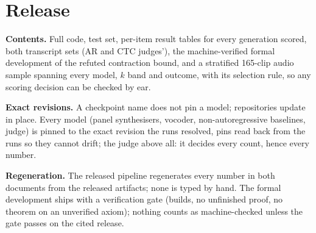\section{Release}
\label{sec:release}

\textbf{Contents.} Full code, test set, per-item result tables for every
generation scored, both transcript sets (AR and CTC judges'), the
machine-verified formal development of the refuted contraction bound, and
a stratified 165-clip audio sample spanning every model, $k$ band and
outcome, with its selection rule, so any scoring decision can be checked
by ear.

\textbf{Exact revisions.} A checkpoint name does not pin a model;
repositories update in place. Every model (panel synthesisers, vocoder,
non-autoregressive baselines, judge) is pinned to the exact revision the
runs resolved, pins read back from the runs so they cannot drift; the
judge above all: it decides every count, hence every number.

\textbf{Regeneration.} The released pipeline regenerates every number in
both documents from the released artifacts; none is typed by hand. The
formal development ships with a verification gate (builds, no unfinished
proof, no theorem on an unverified axiom); nothing counts as
machine-checked unless the gate passes on the cited release.
